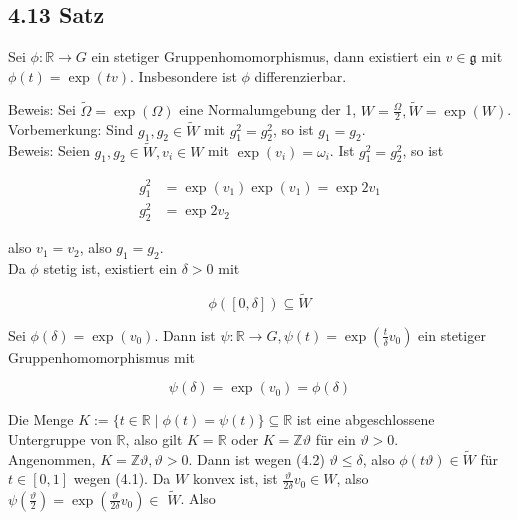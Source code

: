\documentclass[10pt, letterpaper]{article}
\begin{document}
\subsection*{4.13 Satz}
Sei $\phi: \mathbb{R} \rightarrow G$ ein stetiger Gruppenhomomorphismus, dann existiert ein $v \in \mathfrak{g}$ mit $\phi(t)=\exp (t v)$. Insbesondere ist $\phi$ differenzierbar.

Beweis: Sei $\widetilde{\Omega}=\exp (\Omega)$ eine Normalumgebung der 1, $W=\frac{\Omega}{2}, \widetilde{W}=\exp (W)$.\\
Vorbemerkung: Sind $g_{1}, g_{2} \in \widetilde{W}$ mit $g_{1}^{2}=g_{2}^{2}$, so ist $g_{1}=g_{2}$.\\
Beweis: Seien $g_{1}, g_{2} \in \widetilde{W}, v_{i} \in W$ mit $\exp \left(v_{i}\right)=\omega_{i}$. Ist $g_{1}^{2}=g_{2}^{2}$, so ist

$$
\begin{aligned}
g_{1}^{2} & =\exp \left(v_{1}\right) \exp \left(v_{1}\right)=\exp 2 v_{1} \\
g_{2}^{2} & =\exp 2 v_{2}
\end{aligned}
$$

also $v_{1}=v_{2}$, also $g_{1}=g_{2}$.\\
Da $\phi$ stetig ist, existiert ein $\delta>0$ mit


\begin{equation*}
\phi([0, \delta]) \subseteq \widetilde{W} \tag{4.1}
\end{equation*}


Sei $\phi(\delta)=\exp \left(v_{0}\right)$. Dann ist $\psi: \mathbb{R} \rightarrow G, \psi(t)=\exp \left(\frac{t}{\delta} v_{0}\right)$ ein stetiger Gruppenhomomorphismus mit


\begin{equation*}
\psi(\delta)=\exp \left(v_{0}\right)=\phi(\delta) \tag{4.2}
\end{equation*}


Die Menge $K:=\{t \in \mathbb{R} \mid \phi(t)=\psi(t)\} \subseteq \mathbb{R}$ ist eine abgeschlossene Untergruppe von $\mathbb{R}$, also gilt $K=\mathbb{R}$ oder $K=\mathbb{Z} \vartheta$ für ein $\vartheta>0$.\\
Angenommen, $K=\mathbb{Z} \vartheta, \vartheta>0$. Dann ist wegen (4.2) $\vartheta \leq \delta$, also $\phi(t \vartheta) \in \widetilde{W}$ für $t \in[0,1]$ wegen (4.1). Da $W$ konvex ist, ist $\frac{\vartheta}{2 \delta} v_{0} \in W$, also $\psi\left(\frac{\vartheta}{2}\right)=\exp \left(\frac{\vartheta}{2 \delta} v_{0}\right) \in$ $\widetilde{W}$. Also
\end{document}
